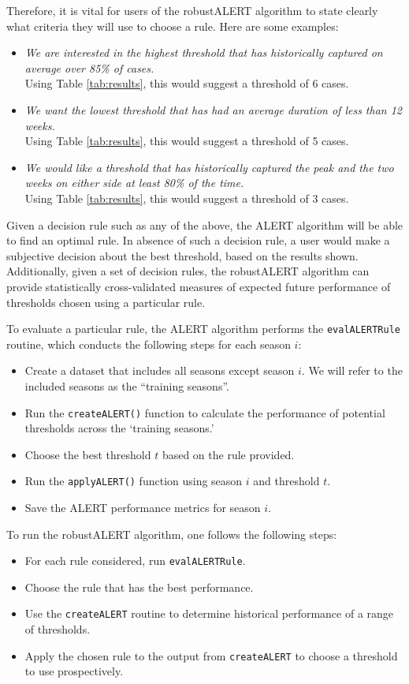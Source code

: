 \documentclass[11pt]{article}\usepackage[]{graphicx}\usepackage[]{color}
\begin{document}
Therefore, it is vital for users of the robustALERT algorithm to state clearly what criteria they will use to choose a rule. Here are some examples:
\begin{itemize}
        \item{\em  We are interested in the highest threshold that has historically captured on average over 85\% of cases.} \\ Using Table \ref{tab:results}, this would suggest a threshold of 6 cases.
        \item {\em We want the lowest threshold that has had an average duration of less than 12 weeks.} \\ Using Table \ref{tab:results}, this would suggest a threshold of 5 cases.
        \item {\em We would like a threshold that has historically captured the peak and the two weeks on either side at least 80\% of the time.} \\ Using Table \ref{tab:results}, this would suggest a threshold of 3 cases.
\end{itemize}

Given a decision rule such as any of the above, the ALERT algorithm will be able to find an optimal rule. In absence of such a decision rule, a user would make a subjective decision about the best threshold, based on the results shown. Additionally, given a set of decision rules, the robustALERT algorithm can provide statistically cross-validated measures of expected future performance of thresholds chosen using a particular rule.  

To evaluate a particular rule, the ALERT algorithm performs the {\tt evalALERTRule} routine, which conducts the following steps for each season $i$:
\begin{itemize}
\item Create a dataset that includes all seasons except season $i$. We will refer to the included seasons as the ``training seasons''.
\item Run the {\tt createALERT()} function to calculate the performance of potential thresholds across the `training seasons.'
\item Choose the best threshold $t$ based on the rule provided.
\item Run the {\tt applyALERT()} function using season $i$ and threshold $t$.
\item Save the ALERT performance metrics for season $i$.
\end{itemize}

To run the robustALERT algorithm, one follows the following steps:
\begin{itemize}
\item For each rule considered, run {\tt evalALERTRule}.
\item Choose the rule that has the best performance.
\item Use the {\tt createALERT} routine to determine historical performance of a range of thresholds.
\item Apply the chosen rule to the output from {\tt createALERT} to choose a threshold to use prospectively.
\end{itemize}
\end{document}
